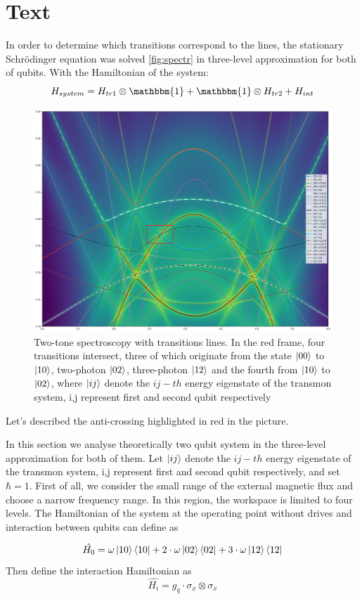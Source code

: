 \documentclass[%
 aip,
 amsmath,amssymb,
 reprint,%
]{revtex4-1}
\begin{document}
\section{Text}


In order to determine which transitions correspond to the lines, the stationary Schrödinger equation was solved \autoref{fig:spectr} in three-level approximation for both of qubits. With the Hamiltonian of the system:
\begin{equation}
	H_{system} = H_{tr1}\otimes\mathbbm{1}+\mathbbm{1}\otimes H_{tr2}+H_{int}
\end{equation}
\begin{figure}[h]
	\centering
	\includegraphics[width=\linewidth]{spectr}
	\caption{Two-tone spectroscopy with transitions lines. In the red frame, four transitions intersect, three of which originate from the state $\ket{00}$ to $\ket{10}$, two-photon
		$\ket{02}$, three-photon
		$\ket{12}$ and the fourth from  $\ket{10}$ to  $\ket{02}$, where $\ket{ij}$ denote the $ij-th$ energy eigenstate of the transmon system, i,j represent first and second qubit respectively}
	\label{fig:spectr}
\end{figure}


 Let's described the anti-crossing highlighted in red in the picture. 
 
 
\newpage
In this section we analyse theoretically two qubit system in the three-level approximation for both of them. Let $\ket{ij}$ denote the $ij-th$ energy eigenstate of the transmon system, i,j represent first and second qubit respectively, and set $\hbar = 1$. First of all, we consider the small range  of the external magnetic flux and choose a narrow frequency range. In this region, the workspace is limited to four levels. The Hamiltonian of the system at the operating point without drives and interaction between qubits can define as

\begin{equation}
\hat{H_0} = \omega \ket{10}\bra{10} + 2\cdot\omega\ket{02}\bra{02}+3\cdot\omega\ket{12}\bra{12}
\end{equation}
Then define the interaction Hamiltonian as
\begin{equation}
	\hat{H_i} = g_{q}\cdot\sigma_x\otimes
\sigma_x
\end{equation}
\end{document}
